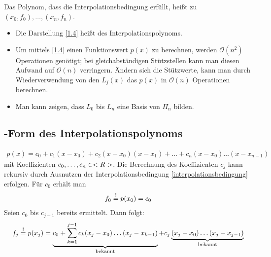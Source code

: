 \begin{*definition}[Interpolationspolynom]
	Das Polynom, dass die Interpolationsbedingung erfüllt, heißt  zu $(x_0,f_0),\dots,(x_n,f_n)$.
\end{*definition}

\begin{remark}
	\begin{itemize}
		\item Die Darstellung \cref{1.4} heißt  des Interpolationspolynoms.
		\item Um mittels \cref{1.4} einen Funktionswert $p(x)$ zu berechnen, werden $\mathcal{O}(n^2)$ Operationen genötigt; bei gleichabständigen Stützstellen kann man diesen Aufwand auf $\mathcal{O}(n)$ verringern. Ändern sich die Stützwerte, kann man durch Wiederverwendung von den $L_j(x)$ das $p(x)$ in $\mathcal{O}(n)$ Operationen berechnen.
		\item Man kann zeigen, dass $L_0$ bis $L_n$ eine Basis von $\Pi_n$ bilden.
	\end{itemize}
\end{remark}

\subsection{-Form des Interpolationspolynoms}

\begin{align}
	\label{1.5}
	p(x) = c_0 + c_1(x-x_0)+c_2(x-x_0)(x-x_1)+\dots+c_n(x-x_0)\dots(x-x_{n-1})
\end{align}
mit Koeffizienten $c_0,\dots,c_n\in<R>$. Die Berechnung des Koeffizienten $c_j$ kann rekursiv durch Ausnutzen der Interpolationsbedingung \cref{interpolationsbedingung} erfolgen. Für $c_0$ erhält man
\begin{align}
	f_0 \overset{!}{=} p(x_0) = c_0 \notag
\end{align}
Seien $c_0$ bis $c_{j-1}$ bereits ermittelt. Dann folgt:
\begin{align}
	f_j \overset{!}{=} p(x_j) = \underbrace{c_0 + \sum_{k=1}^{j-1} c_k(x_j-x_0)\dots(x_j-x_{k-1})}_{\text{bekannt}} + c_j \underbrace{(x_j-x_0)\dots(x_j-x_{j-1})}_{\text{bekannt}}\notag
\end{align} 

